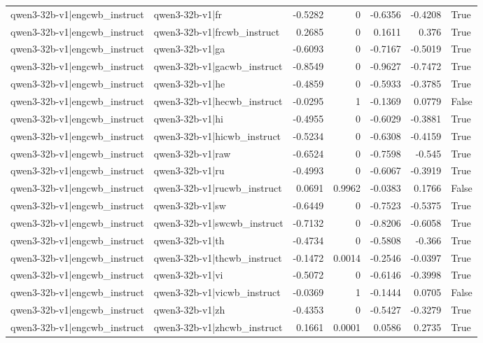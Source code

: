 \begin{table}
\begin{tabular}{l l r r r r l}
qwen3-32b-v1|engcwb_instruct & qwen3-32b-v1|fr & -0.5282 & 0 & -0.6356 & -0.4208 & True \\
qwen3-32b-v1|engcwb_instruct & qwen3-32b-v1|frcwb_instruct & 0.2685 & 0 & 0.1611 & 0.376 & True \\
qwen3-32b-v1|engcwb_instruct & qwen3-32b-v1|ga & -0.6093 & 0 & -0.7167 & -0.5019 & True \\
qwen3-32b-v1|engcwb_instruct & qwen3-32b-v1|gacwb_instruct & -0.8549 & 0 & -0.9627 & -0.7472 & True \\
qwen3-32b-v1|engcwb_instruct & qwen3-32b-v1|he & -0.4859 & 0 & -0.5933 & -0.3785 & True \\
qwen3-32b-v1|engcwb_instruct & qwen3-32b-v1|hecwb_instruct & -0.0295 & 1 & -0.1369 & 0.0779 & False \\
qwen3-32b-v1|engcwb_instruct & qwen3-32b-v1|hi & -0.4955 & 0 & -0.6029 & -0.3881 & True \\
qwen3-32b-v1|engcwb_instruct & qwen3-32b-v1|hicwb_instruct & -0.5234 & 0 & -0.6308 & -0.4159 & True \\
qwen3-32b-v1|engcwb_instruct & qwen3-32b-v1|raw & -0.6524 & 0 & -0.7598 & -0.545 & True \\
qwen3-32b-v1|engcwb_instruct & qwen3-32b-v1|ru & -0.4993 & 0 & -0.6067 & -0.3919 & True \\
qwen3-32b-v1|engcwb_instruct & qwen3-32b-v1|rucwb_instruct & 0.0691 & 0.9962 & -0.0383 & 0.1766 & False \\
qwen3-32b-v1|engcwb_instruct & qwen3-32b-v1|sw & -0.6449 & 0 & -0.7523 & -0.5375 & True \\
qwen3-32b-v1|engcwb_instruct & qwen3-32b-v1|swcwb_instruct & -0.7132 & 0 & -0.8206 & -0.6058 & True \\
qwen3-32b-v1|engcwb_instruct & qwen3-32b-v1|th & -0.4734 & 0 & -0.5808 & -0.366 & True \\
qwen3-32b-v1|engcwb_instruct & qwen3-32b-v1|thcwb_instruct & -0.1472 & 0.0014 & -0.2546 & -0.0397 & True \\
qwen3-32b-v1|engcwb_instruct & qwen3-32b-v1|vi & -0.5072 & 0 & -0.6146 & -0.3998 & True \\
qwen3-32b-v1|engcwb_instruct & qwen3-32b-v1|vicwb_instruct & -0.0369 & 1 & -0.1444 & 0.0705 & False \\
qwen3-32b-v1|engcwb_instruct & qwen3-32b-v1|zh & -0.4353 & 0 & -0.5427 & -0.3279 & True \\
qwen3-32b-v1|engcwb_instruct & qwen3-32b-v1|zhcwb_instruct & 0.1661 & 0.0001 & 0.0586 & 0.2735 & True \\

\end{tabular}
\end{table}
